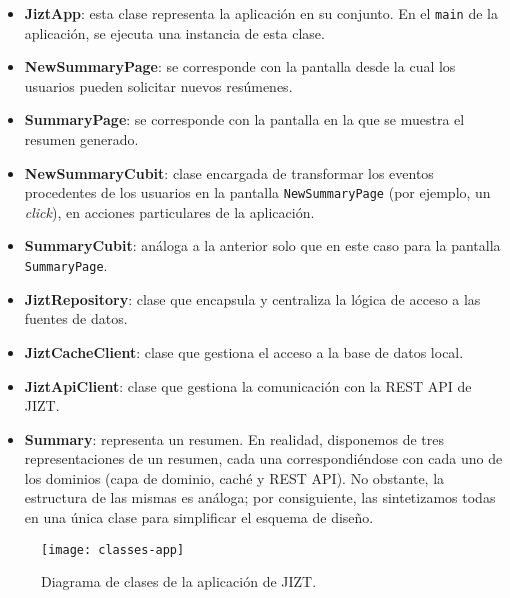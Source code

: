 \vspace{-0.2cm}
\begin{itemize} [\textbullet]
	\item \textbf{JiztApp}: esta clase representa la aplicación en su conjunto. En el \texttt{main} de la aplicación, se ejecuta una instancia de esta clase.
	
	\item \textbf{NewSummaryPage}: se corresponde con la pantalla desde la cual los usuarios pueden solicitar nuevos resúmenes.
	
	\item \textbf{SummaryPage}: se corresponde con la pantalla en la que se muestra el resumen generado.
	
	\item \textbf{NewSummaryCubit}: clase encargada de transformar los eventos procedentes de los usuarios en la pantalla \texttt{NewSummaryPage} (por ejemplo, un \emph{click}), en acciones particulares de la aplicación.
	
	\item \textbf{SummaryCubit}: análoga a la anterior solo que en este caso para la pantalla \texttt{SummaryPage}.
	
	\item \textbf{JiztRepository}: clase que encapsula y centraliza la lógica de acceso a las fuentes de datos.
	
	\item \textbf{JiztCacheClient}: clase que gestiona el acceso a la base de datos local.
	
	\item \textbf{JiztApiClient}: clase que gestiona la comunicación con la REST API de JIZT.
	
	\item \textbf{Summary}: representa un resumen. En realidad, disponemos de tres representaciones de un resumen, cada una correspondiéndose con cada uno de los dominios (capa de dominio, caché y REST API). No obstante, la estructura de las mismas es análoga; por consiguiente, las sintetizamos todas en una única clase para simplificar el esquema de diseño.
\end{itemize}


\begin{figure}[h]
	\centering
	\texttt{[image: classes-app]}
	\vspace{-0.5cm}
	\caption{Diagrama de clases de la aplicación de JIZT.}
\end{figure}

